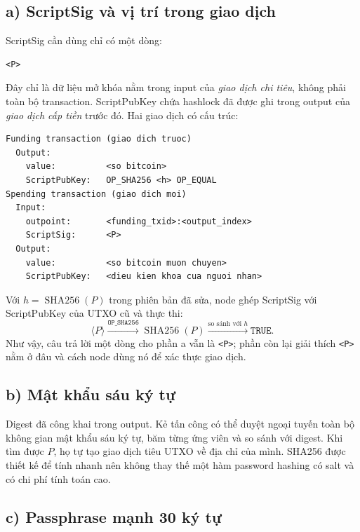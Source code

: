 \subsection*{a) ScriptSig và vị trí trong giao dịch}

ScriptSig cần dùng chỉ có một dòng:
\begin{lstlisting}[style=bitcoin]
<P>
\end{lstlisting}

Đây chỉ là dữ liệu mở khóa nằm trong input của \emph{giao dịch chi tiêu},
không phải toàn bộ transaction. ScriptPubKey chứa hashlock đã được ghi trong
output của \emph{giao dịch cấp tiền} trước đó. Hai giao dịch có cấu trúc:

\begin{samepage}
\begin{lstlisting}[style=bitcoin,basicstyle=\ttfamily\footnotesize,
                   aboveskip=0.4em,belowskip=0.4em]
Funding transaction (giao dich truoc)
  Output:
    value:          <so bitcoin>
    ScriptPubKey:   OP_SHA256 <h> OP_EQUAL
Spending transaction (giao dich moi)
  Input:
    outpoint:       <funding_txid>:<output_index>
    ScriptSig:      <P>
  Output:
    value:          <so bitcoin muon chuyen>
    ScriptPubKey:   <dieu kien khoa cua nguoi nhan>
\end{lstlisting}
\end{samepage}

Với $h=\operatorname{SHA256}(P)$ trong phiên bản đã sửa, node ghép ScriptSig
với ScriptPubKey của UTXO cũ và thực thi:
\[
  \langle P\rangle
  \xrightarrow{\texttt{OP\_SHA256}}
  \operatorname{SHA256}(P)
  \xrightarrow{\text{so sánh với }h}
  \texttt{TRUE}.
\]
Như vậy, câu trả lời một dòng cho phần a vẫn là \texttt{<P>}; phần còn lại
giải thích \texttt{<P>} nằm ở đâu và cách node dùng nó để xác thực giao dịch.

\subsection*{b) Mật khẩu sáu ký tự}

Digest đã công khai trong output. Kẻ tấn công có thể duyệt ngoại tuyến toàn bộ
không gian mật khẩu sáu ký tự, băm từng ứng viên và so sánh với digest. Khi tìm
được $P$, họ tự tạo giao dịch tiêu UTXO về địa chỉ của mình. SHA256 được thiết
kế để tính nhanh nên không thay thế một hàm password hashing có salt và có chi
phí tính toán cao.

\subsection*{c) Passphrase mạnh 30 ký tự}


